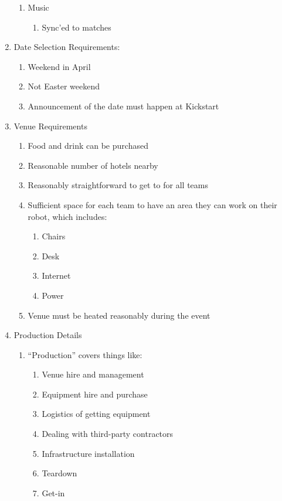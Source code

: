 \begin{enumerate}
\begin{enumerate}
  \item Music
    \begin{enumerate}
    \item Sync'ed to matches
    \end{enumerate}

  \end{enumerate}

\item Date Selection Requirements:
  \begin{enumerate}
  \item Weekend in April
  \item Not Easter weekend
  \item Announcement of the date must happen at Kickstart
  \end{enumerate}

\item Venue Requirements
    \begin{enumerate}
    \item Food and drink can be purchased
    \item Reasonable number of hotels nearby
    \item Reasonably straightforward to get to for all teams
    \item Sufficient space for each team to have an area they can work on their robot, which includes:
      \begin{enumerate}
      \item Chairs
      \item Desk
      \item Internet
      \item Power
      \end{enumerate}
    \item Venue must be heated reasonably during the event
    \end{enumerate}

\item Production Details
  \begin{enumerate}
  \item ``Production'' covers things like:
    \begin{enumerate}
    \item Venue hire and management
    \item Equipment hire and purchase
    \item Logistics of getting equipment
    \item Dealing with third-party contractors
    \item Infrastructure installation
    \item Teardown
    \item Get-in
    \end{enumerate}


\end{enumerate}
\end{enumerate}

